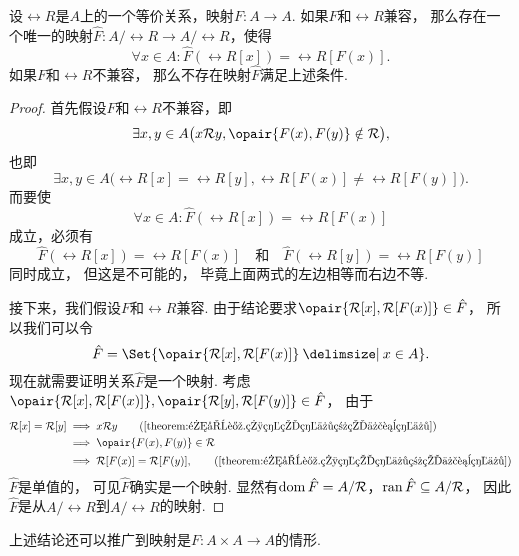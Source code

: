 \begin{theorem}\label{theorem:集合论.与等价关系兼容的映射的性质}
设\(\rel{R}\)是\(A\)上的一个等价关系，映射\(F\colon A \to A\).
如果\(F\)和\(\rel{R}\)兼容，
那么存在一个唯一的映射\(\hat{F}\colon A/\rel{R} \to A/\rel{R}\)，使得\[
	\forall x \in A:
	\hat{F}(\rel{R}[x]) = \rel{R}[F(x)].
\]
如果\(F\)和\(\rel{R}\)不兼容，
那么不存在映射\(\hat{F}\)满足上述条件.
\begin{proof}
首先假设\(F\)和\(\rel{R}\)不兼容，即\[
	\exists x,y \in A \bigl(
		x \rel{R} y,
		\opair{F(x),F(y)} \notin \rel{R}
	\bigr),
\]
也即\[
	\exists x,y \in A \bigl(
		\rel{R}[x] = \rel{R}[y],
		\rel{R}[F(x)] \neq \rel{R}[F(y)]
	\bigr).
\]
而要使\[
	\forall x \in A:
	\hat{F}(\rel{R}[x]) = \rel{R}[F(x)]
\]成立，必须有\[
	\hat{F}(\rel{R}[x])
	= \rel{R}[F(x)]
	\quad\text{和}\quad
	\hat{F}(\rel{R}[y])
	= \rel{R}[F(y)]
\]同时成立，
但这是不可能的，
毕竟上面两式的左边相等而右边不等.

接下来，我们假设\(F\)和\(\rel{R}\)兼容.
由于结论要求\(\opair{\rel{R}[x],\rel{R}[F(x)]} \in \hat{F}\)，
所以我们可以令\[
	\hat{F} = \Set{ \opair{\rel{R}[x],\rel{R}[F(x)]} \given x \in A }.
\]
现在就需要证明关系\(\hat{F}\)是一个映射.
考虑\(\opair{\rel{R}[x],\rel{R}[F(x)]},
\opair{\rel{R}[y],\rel{R}[F(y)]} \in \hat{F}\)，
由于\begin{align*}
	\rel{R}[x] = \rel{R}[y]
	&\implies
	x \rel{R} y
	\tag{\cref{theorem:集合论.相等的等价类的代表等价}} \\
	&\implies
	\opair{F(x),F(y)} \in \rel{R} \\
	&\implies
	\rel{R}[F(x)] = \rel{R}[F(y)],
	\tag{\cref{theorem:集合论.相等的等价类的代表等价}}
\end{align*}
\(\hat{F}\)是单值的，
可见\(\hat{F}\)确实是一个映射.
显然有\(\operatorname{dom} \hat{F} = A/\mathcal{R}\)，\(\operatorname{ran} \hat{F} \subseteq A/\mathcal{R}\)，
因此\(\hat{F}\)是从\(A/\rel{R}\)到\(A/\rel{R}\)的映射.
\end{proof}
\end{theorem}
上述结论还可以推广到映射是\(F\colon A \times A \to A\)的情形.

